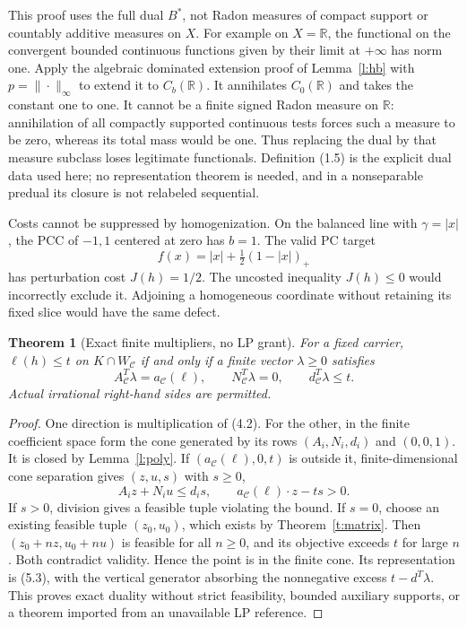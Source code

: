 \documentclass[11pt]{article}
\newtheorem{theorem}{Theorem}[section]
\newcommand{\R}{\mathbb R}\newcommand{\Q}{\mathbb Q}\newcommand{\Z}{\mathbb Z}
\begin{document}
This proof uses the full dual $B^*$, not Radon measures of compact support or countably additive measures on $X$. For example on $X=\R$, the functional on the convergent bounded continuous functions given by their limit at $+\infty$ has norm one. Apply the algebraic dominated extension proof of Lemma~\ref{l:hb} with $p=\|\cdot\|_\infty$ to extend it to $C_b(\R)$. It annihilates $C_0(\R)$ and takes the constant one to one. It cannot be a finite signed Radon measure on $\R$: annihilation of all compactly supported continuous tests forces such a measure to be zero, whereas its total mass would be one. Thus replacing the dual by that measure subclass loses legitimate functionals. Definition (1.5) is the explicit dual data used here; no representation theorem is needed, and in a nonseparable predual its closure is not relabeled sequential.

Costs cannot be suppressed by homogenization. On the balanced line with $\gamma=|x|$, the PCC of $-1,1$ centered at zero has $b=1$. The valid PC target
\[
 f(x)=|x|+\tfrac12(1-|x|)_+
\]
has perturbation cost $J(h)=1/2$. The uncosted inequality $J(h)\leq0$ would incorrectly exclude it. Adjoining a homogeneous coordinate without retaining its fixed slice would have the same defect.

\begin{theorem}[Exact finite multipliers, no LP grant]\label{t:mult}
For a fixed carrier, $\ell(h)\leq t$ on $K\cap W_\mathcal C$ if and only if a finite vector $\lambda\geq0$ satisfies
\[
 A_\mathcal C^T\lambda=a_\mathcal C(\ell),\qquad
 N_\mathcal C^T\lambda=0,\qquad d_\mathcal C^T\lambda\leq t.           \tag{5.3}
\]
Actual irrational right-hand sides are permitted.
\end{theorem}
\begin{proof}
One direction is multiplication of (4.2). For the other, in the finite coefficient space form the cone generated by its rows $(A_i,N_i,d_i)$ and $(0,0,1)$. It is closed by Lemma~\ref{l:poly}. If $(a_\mathcal C(\ell),0,t)$ is outside it, finite-dimensional cone separation gives $(z,u,s)$ with $s\geq0$,
\[
 A_i z+N_i u\leq d_i s,\qquad a_\mathcal C(\ell)\cdot z-ts>0.
\]
If $s>0$, division gives a feasible tuple violating the bound. If $s=0$, choose an existing feasible tuple $(z_0,u_0)$, which exists by Theorem~\ref{t:matrix}. Then $(z_0+nz,u_0+nu)$ is feasible for all $n\geq0$, and its objective exceeds $t$ for large $n$. Both contradict validity. Hence the point is in the finite cone. Its representation is (5.3), with the vertical generator absorbing the nonnegative excess $t-d^T\lambda$. This proves exact duality without strict feasibility, bounded auxiliary supports, or a theorem imported from an unavailable LP reference.
\end{proof}
\end{document}
